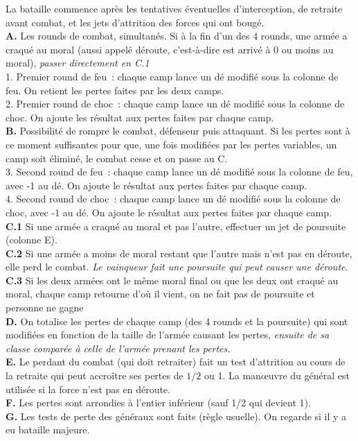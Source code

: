 \noindent
La bataille commence après les tentatives éventuelles d'interception, de
retraite avant combat, et les jets d'attrition des forces qui ont
bougé. \\
{\bf A.} Les rounds de combat, simultanés.
Si à la fin d'un des 4 rounds, une armée a craqué au moral (aussi appelé déroute,
c'est-à-dire est arrivé à 0 ou moins au moral), \textit{passer directement en C.1} \\
1. Premier round de feu~: chaque camp lance un dé modifié sous la colonne de feu. On retient les
pertes faites par les deux camps. \\
2. Premier round de choc~: chaque camp lance un dé modifié sous la colonne de choc. On ajoute les
résultat aux pertes faites par chaque camp. \\
{\bf B.} Possibilité de rompre le combat, défenseur puis attaquant. Si les
pertes sont à ce moment suffisantes pour que, une fois modifiées par les pertes variables,
un camp soit éliminé, le combat cesse et on passe au C. \\
3. Second round de feu~: chaque camp lance un dé modifié sous la colonne de feu, avec -1 au dé.
On ajoute le résultat aux pertes faites par chaque camp. \\
4. Second round de choc~: chaque camp lance un dé modifié sous la colonne de choc, avec -1 au dé.
On ajoute le résultat aux pertes faites par chaque camp. \\
{\bf C.1} Si une armée a craqué au moral et pas l'autre, effectuer un jet de poursuite (colonne E). \\
{\bf C.2} Si une armée a moins de moral restant que l'autre mais n'est pas en déroute, elle perd le combat.
\textit{Le vainqueur fait une poursuite qui peut causer une déroute}. \\
{\bf C.3} Si les deux armées ont le même moral final ou que les deux ont craqué au moral,
chaque camp retourne d'où il vient, on ne fait pas de poursuite et personne ne gagne \\
{\bf D.} On totalise les pertes de chaque camp (des 4 rounds et la poursuite) qui sont modifiées
en fonction de la taille de l'armée causant les pertes,
\textit{ensuite de sa classe comparée à celle de
l'armée prenant les pertes}. \\
{\bf E.} Le perdant du combat (qui doit retraiter) fait un test d'attrition au cours de la retraite
qui peut accroître ses pertes de $1/2$ ou 1. La man{\oe}uvre du général est utilisée
si la force n'est pas en déroute. \\
{\bf F.} Les pertes sont arrondies à l'entier inférieur (sauf 1/2 qui devient 1).\\
{\bf G.} Les tests de perte des généraux sont faits (règle usuelle). On regarde si
il y a eu bataille majeure. \\

